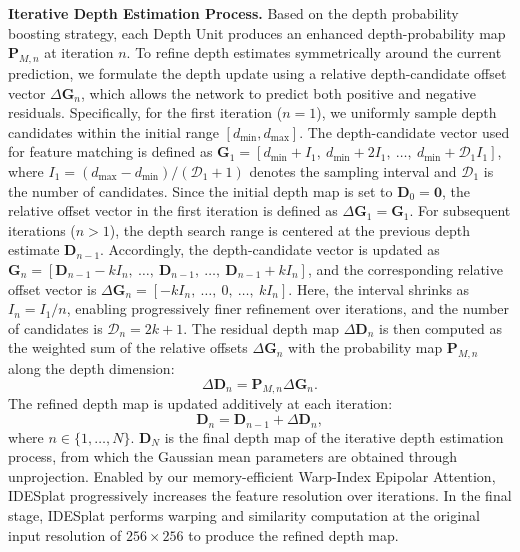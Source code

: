 \noindent \textbf{Iterative Depth Estimation Process.}
%
Based on the depth probability boosting strategy, each Depth Unit produces an enhanced depth-probability map $\bm{P}_{M,n}$ at iteration $n$.
%
To refine depth estimates symmetrically around the current prediction, we formulate the depth update using a relative depth-candidate offset vector $\Delta\bm{G}_{n}$, which allows the network to predict both positive and negative residuals.
%
Specifically, for the first iteration ($n=1$), we uniformly sample depth candidates within the initial range $[d_{\min}, d_{\max}]$. The depth-candidate vector used for feature matching is defined as $\bm{G}_{1} = [d_{\min}+{I}_{1},\ d_{\min}+2{I}_{1},\ \ldots,\ d_{\min}+\mathcal{D}_{1}{I}_{1}]$, where ${I}_{1} = (d_{\max}-d_{\min})/(\mathcal{D}_{1}+1)$ denotes the sampling interval and $\mathcal{D}_{1}$ is the number of candidates. Since the initial depth map is set to $\bm{D}_{0}=\bm{0}$, the relative offset vector in the first iteration is defined as $\Delta\bm{G}_{1}=\bm{G}_{1}$.
%
For subsequent iterations ($n>1$), the depth search range is centered at the previous depth estimate $\bm{D}_{n-1}$. Accordingly, the depth-candidate vector is updated as $\bm{G}_{n} = [\bm{D}_{n-1}-k{I}_{n},\ \ldots,\ \bm{D}_{n-1},\ \ldots,\ \bm{D}_{n-1}+k{I}_{n}]$, and the corresponding relative offset vector is $\Delta\bm{G}_{n} = [-k{I}_{n},\ \ldots,\ 0,\ \ldots,\ k{I}_{n}]$. Here, the interval shrinks as ${I}_{n} = {I}_{1}/n$, enabling progressively finer refinement over iterations, and the number of candidates is $\mathcal{D}_{n}=2k+1$.
%
The residual depth map $\Delta\bm{D}_{n}$ is then computed as the weighted sum of the relative offsets $\Delta\bm{G}_{n}$ with the probability map $\bm{P}_{M,n}$ along the depth dimension:
%
\begin{equation}
\label{eq:softmax_depth}
    {\Delta \bm D_{n}} = {\bm P_{M,n}} {\Delta \bm G_{n}}.
\end{equation}
%
The refined depth map is updated additively at each iteration:
%
\begin{equation}
\label{eq:depth_update}
    {\bm D_{n}} = {\bm D_{n-1}} + {\Delta \bm D_{n}},
\end{equation}
%
where $n \in \{ 1, \ldots, N \}$. ${\bm D_{N}}$ is the final depth map of the iterative depth estimation process, from which the Gaussian mean parameters are obtained through unprojection.
%
Enabled by our memory-efficient Warp-Index Epipolar Attention, IDESplat progressively increases the feature resolution over iterations.
%
In the final stage, IDESplat performs warping and similarity computation at the original input resolution of $256 \times 256$ to produce the refined depth map.





